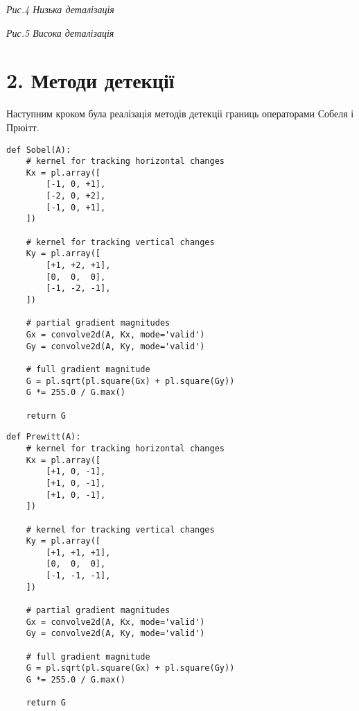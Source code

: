 \documentclass{/home/alx/Documents/LaTex/nulp}
\begin{document}
\begin{center}

\textit{Рис.4 Низька деталізація}
\end{center}

\begin{center}

\textit{Рис.5 Висока деталізація}
\end{center}

\newpage

\section*{2. Методи детекції}

Наступним кроком була реалізація методів детекціі границь операторами Собеля і Прюітт.

\begin{verbatim}
def Sobel(A):
    # kernel for tracking horizontal changes
    Kx = pl.array([
        [-1, 0, +1],
        [-2, 0, +2],
        [-1, 0, +1],
    ])

    # kernel for tracking vertical changes
    Ky = pl.array([
        [+1, +2, +1],
        [0,  0,  0],
        [-1, -2, -1],
    ])

    # partial gradient magnitudes
    Gx = convolve2d(A, Kx, mode='valid')
    Gy = convolve2d(A, Ky, mode='valid')

    # full gradient magnitude
    G = pl.sqrt(pl.square(Gx) + pl.square(Gy))
    G *= 255.0 / G.max()

    return G
\end{verbatim}

\newpage

\begin{verbatim}
def Prewitt(A):
    # kernel for tracking horizontal changes
    Kx = pl.array([
        [+1, 0, -1],
        [+1, 0, -1],
        [+1, 0, -1],
    ])

    # kernel for tracking vertical changes
    Ky = pl.array([
        [+1, +1, +1],
        [0,  0,  0],
        [-1, -1, -1],
    ])

    # partial gradient magnitudes
    Gx = convolve2d(A, Kx, mode='valid')
    Gy = convolve2d(A, Ky, mode='valid')

    # full gradient magnitude
    G = pl.sqrt(pl.square(Gx) + pl.square(Gy))
    G *= 255.0 / G.max()

    return G
\end{verbatim}
\end{document}
